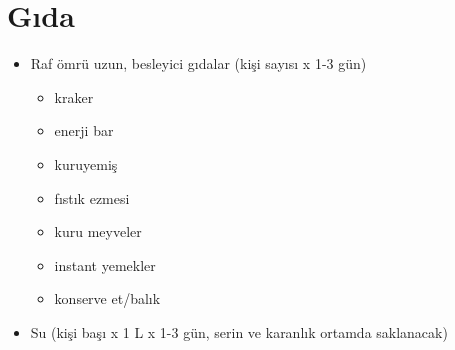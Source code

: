 \chapter*{Gıda}

\begin{itemize}
	\item Raf ömrü uzun, besleyici gıdalar (kişi sayısı x 1-3 gün)
	\begin{itemize}
		\item kraker
		\item enerji bar
		\item kuruyemiş
		\item fıstık ezmesi
		\item kuru meyveler
		\item instant yemekler
		\item konserve et/balık
	\end{itemize}
	\item Su (kişi başı x 1 L x 1-3 gün, serin ve karanlık ortamda saklanacak)
\end{itemize}